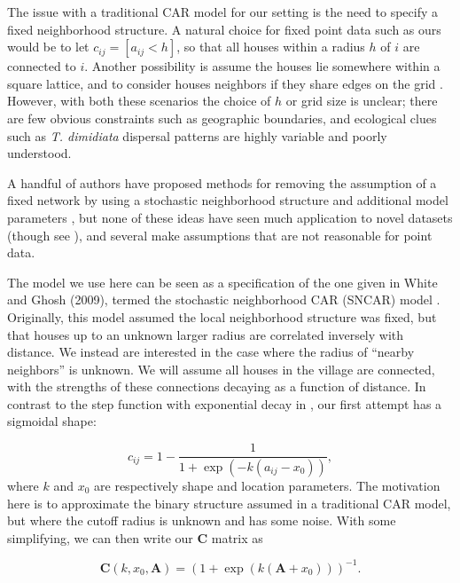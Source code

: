 \documentclass{scrartcl}
\newcommand{\mat}[1]{\bm{#1}}
\begin{document}
The issue with a traditional CAR model for our setting is the need to
specify a fixed neighborhood structure. A natural choice for fixed
point data such as ours would be to let $c_{ij} = [a_{ij} < h]$, so
that all houses within a radius $h$ of $i$ are connected to
$i$. Another possibility is assume the houses lie somewhere within a
square lattice, and to consider houses neighbors if they share edges
on the grid \cite{Paciorek2013}. However, with both these scenarios
the choice of $h$ or grid size is unclear; there are few obvious
constraints such as geographic boundaries, and ecological clues such
as \textit{T. dimidiata} dispersal patterns are highly variable and
poorly understood.

A handful of authors have proposed methods for removing the assumption
of a fixed network by using a stochastic neighborhood structure and
additional model parameters \cite{Gao2019, Rodrigues2012}, but none of
these ideas have seen much application to novel datasets (though see
\cite{Whittle2020}), and several make assumptions that are not
reasonable for point data.

The model we use here can be seen as a specification of the one given
in White and Ghosh (2009), termed the stochastic neighborhood CAR
(SNCAR) model \cite{White2009}. Originally, this model assumed the
local neighborhood structure was fixed, but that houses up to an
unknown larger radius are correlated inversely with distance. We
instead are interested in the case where the radius of ``nearby
neighbors'' is unknown. We will assume all houses in the village are
connected, with the strengths of these connections decaying as a
function of distance. In contrast to the step function with
exponential decay in \cite{White2009}, our first attempt has a
sigmoidal shape:

\begin{equation}
  \label{eq:decay-func}
  c_{ij} = 1 - \frac{1}{1 + \exp(-k (a_{ij} - x_0))},
\end{equation}
where $k$ and $x_0$ are respectively shape and location
parameters. The motivation here is to approximate the binary structure
assumed in a traditional CAR model, but where the cutoff radius is
unknown and has some noise. With some simplifying, we can then write
our $\mat{C}$ matrix as

\begin{equation}
  \label{eq:decay-mat}
  \mat{C}(k, x_0, \mat{A}) = (1 + \exp(k (\mat{A} + x_0)))^{-1}.
\end{equation}
\end{document}
